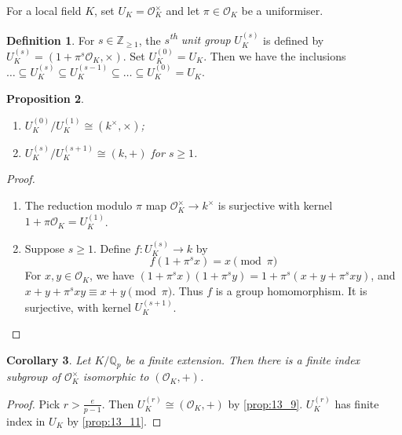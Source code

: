 \documentclass[11pt]{article}
\theoremstyle{definition}
\newtheorem{definition}{Definition}[subsection]
\theoremstyle{plain}
\newtheorem{proposition}[definition]{Proposition}
\newtheorem{corollary}[definition]{Corollary}
\theoremstyle{remark}
\newcommand{\ZZ}{\mathbb{Z}}
\newcommand{\QQ}{\mathbb{Q}}
\newcommand{\cO}{\mathcal{O}}
\begin{document}
\noindent For a local field $K$, set $U_K = \cO_K^\times$ and let $\pi \in \cO_K$ be a uniformiser.

\begin{definition}\label{def:13_10}
    For $s \in \ZZ_{\ge 1}$, the \emph{$s$\textsuperscript{th} unit group} $U_K^{(s)}$ is defined by $U_K^{(s)} = (1 + \pi^s \cO_K, \times)$. Set $U_K^{(0)} = U_K$. Then we have the inclusions $\ldots \subseteq U_K^{(s)} \subseteq U_K^{(s-1)} \subseteq \ldots \subseteq U_K^{(0)} = U_K$.
\end{definition}

\begin{proposition}\label{prop:13_11}\phantom{}
    \begin{enumerate}
        \item $U_K^{(0)} / U_K^{(1)} \cong (k^\times, \times)$;
        \item $U_K^{(s)} / U_K^{(s+1)} \cong (k, +)$ for $s \ge 1$.
    \end{enumerate}
\end{proposition}
\begin{proof}\phantom{}
    \begin{enumerate}
        \item The reduction modulo $\pi$ map $\cO_K^\times \to k^\times$ is surjective with kernel $1 + \pi \cO_K = U_K^{(1)}$.

        \item Suppose $s \ge 1$. Define $f : U_K^{(s)} \to k$ by
            \begin{equation*}
                f(1 + \pi^s x) = x \pmod{\pi}
            \end{equation*}
            For $x, y \in \cO_K$, we have $(1 + \pi^s x)(1 + \pi^s y) = 1 + \pi^s (x + y + \pi^s x y)$, and $x + y + \pi^s x y \equiv x + y \pmod{\pi}$. Thus $f$ is a group homomorphism. It is surjective, with kernel $U_K^{(s+1)}$. \qedhere
    \end{enumerate}
\end{proof}

\begin{corollary}\label{cor:13_12}
    Let $K/\QQ_p$ be a finite extension. Then there is a finite index subgroup of $\cO_K^\times$ isomorphic to $(\cO_K, +)$.
\end{corollary}
\begin{proof}
    Pick $r > \frac{e}{p-1}$. Then $U_K^{(r)} \cong (\cO_K, +)$ by \autoref{prop:13_9}. $U_K^{(r)}$ has finite index in $U_K$ by \autoref{prop:13_11}.
\end{proof}
\end{document}
